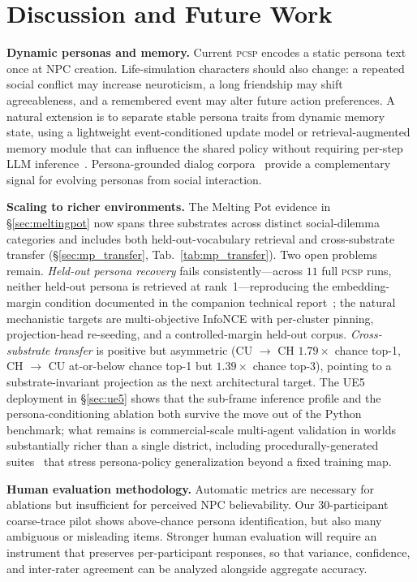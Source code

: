 \documentclass[conference]{IEEEtran}
\newcommand{\PCSP}{\textsc{pcsp}\xspace}
\begin{document}
\section{Discussion and Future Work}
\label{sec:discussion}

\textbf{Dynamic personas and memory.}
Current \PCSP encodes a static persona text once at NPC creation. Life-simulation
characters should also change: a repeated social conflict may increase
neuroticism, a long friendship may shift agreeableness, and a remembered event
may alter future action preferences. A natural extension is to separate stable
persona traits from dynamic memory state, using a lightweight event-conditioned
update model or retrieval-augmented memory module that can influence the shared
policy without requiring per-step LLM inference~\cite{park2023generative}.
Persona-grounded dialog corpora~\cite{zhang2018personachat} provide a
complementary signal for evolving personas from social interaction.

\textbf{Scaling to richer environments.}
The Melting Pot evidence in \S\ref{sec:meltingpot} now spans three substrates
across distinct social-dilemma categories and includes both held-out-vocabulary
retrieval and cross-substrate transfer (\S\ref{sec:mp_transfer},
Tab.~\ref{tab:mp_transfer}). Two open problems remain. \emph{Held-out
persona recovery} fails consistently---across $11$ full \PCSP{} runs, neither
held-out persona is retrieved at rank~1---reproducing the embedding-margin
condition documented in the companion technical
report~\cite{phase5report}; the natural mechanistic targets are
multi-objective InfoNCE with per-cluster pinning, projection-head re-seeding,
and a controlled-margin held-out corpus. \emph{Cross-substrate transfer}
is positive but asymmetric (CU $\to$ CH $1.79\times$ chance top-1,
CH $\to$ CU at-or-below chance top-1 but $1.39\times$ chance top-3), pointing
to a substrate-invariant projection as the next architectural target.
The UE5 deployment in \S\ref{sec:ue5} shows that the sub-frame inference
profile and the persona-conditioning ablation both survive the move out of
the Python benchmark; what remains is commercial-scale multi-agent
validation in worlds substantially richer than a single district, including
procedurally-generated suites~\cite{cobbe2020procgen} that stress
persona-policy generalization beyond a fixed training map.

\textbf{Human evaluation methodology.}
Automatic metrics are necessary for ablations but insufficient for perceived NPC
believability. Our 30-participant coarse-trace pilot shows above-chance persona
identification, but also many ambiguous or misleading items. Stronger human
evaluation will require an instrument that preserves per-participant responses,
so that variance, confidence, and inter-rater agreement can be analyzed
alongside aggregate accuracy.
\end{document}
